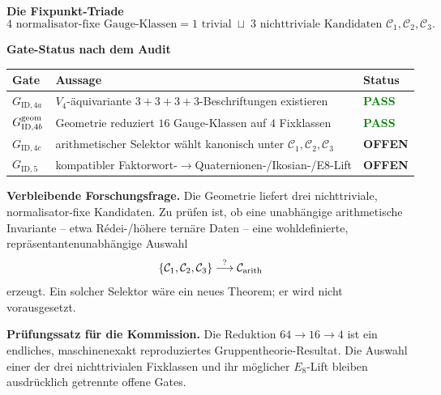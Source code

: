 \documentclass[10pt,a4paper]{article}
\newcommand{\PASS}{\textcolor{green}{\textbf{PASS}}}
\newcommand{\OPEN}{\textcolor{amber}{\textbf{OFFEN}}}
\begin{document}
\begin{center}
\begin{tcolorbox}[width=.88\textwidth,colback=softblue,colframe=navy,boxrule=.8pt,arc=1.5mm]
\centering
{\large\bfseries Die Fixpunkt-Triade}\\[1mm]
\[
\boxed{4\text{ normalisator-fixe Gauge-Klassen}}
=\boxed{1\text{ trivial}}\;\sqcup\;\boxed{3\text{ nichttriviale Kandidaten }\mathcal C_1,\mathcal C_2,\mathcal C_3}.
\]
\end{tcolorbox}
\end{center}

\textbf{Gate-Status nach dem Audit}

\begin{center}
\small
\begin{tabularx}{\textwidth}{>{\bfseries}l X l}
\toprule
Gate & Aussage & Status\\
\midrule
$G_{\mathrm{ID},4a}$ & $V_4$-äquivariante $3+3+3+3$-Beschriftungen existieren & \PASS\\
$G_{\mathrm{ID},4b}^{\rm geom}$ & Geometrie reduziert $16$ Gauge-Klassen auf $4$ Fixklassen & \PASS\\
$G_{\mathrm{ID},4c}$ & arithmetischer Selektor wählt kanonisch unter $\mathcal C_1,\mathcal C_2,\mathcal C_3$ & \OPEN\\
$G_{\mathrm{ID},5}$ & kompatibler Faktorwort-$\to$Quaternionen-/Ikosian-/E8-Lift & \OPEN\\
\bottomrule
\end{tabularx}
\end{center}

\begin{statusbox}
\textbf{Verbleibende Forschungsfrage.} Die Geometrie liefert drei nichttriviale, normalisator-fixe Kandidaten. Zu prüfen ist, ob eine unabhängige arithmetische Invariante -- etwa Rédei-/höhere ternäre Daten -- eine wohldefinierte, repräsentantenunabhängige Auswahl
\[
\{\mathcal C_1,\mathcal C_2,\mathcal C_3\}\stackrel{?}{\longrightarrow}\mathcal C_{\rm arith}
\]
erzeugt. Ein solcher Selektor wäre ein neues Theorem; er wird nicht vorausgesetzt.
\end{statusbox}

\begin{proofbox}
\textbf{Prüfungssatz für die Kommission.} Die Reduktion $64\to16\to4$ ist ein endliches, maschinenexakt reproduziertes Gruppentheorie-Resultat. Die Auswahl einer der drei nichttrivialen Fixklassen und ihr möglicher $E_8$-Lift bleiben ausdrücklich getrennte offene Gates.
\end{proofbox}
\end{document}
